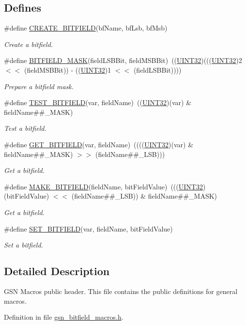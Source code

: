 \subsection*{Defines}
\begin{DoxyCompactItemize}
\item 
\#define \hyperlink{a00657_ga4af6407b36a81973e93a80026461312d}{CREATE\_\-BITFIELD}(bfName, bfLsb, bfMsb)
\begin{DoxyCompactList}\small\item\em Create a bitfield. \end{DoxyCompactList}\item 
\#define \hyperlink{a00657_ga330112fe57abc76abf484fedd191ca29}{BITFIELD\_\-MASK}(fieldLSBBit, fieldMSBBit)~((\hyperlink{a00660_gae1e6edbbc26d6fbc71a90190d0266018}{UINT32})(((\hyperlink{a00660_gae1e6edbbc26d6fbc71a90190d0266018}{UINT32})2 $<$$<$ (fieldMSBBit)) -\/ ((\hyperlink{a00660_gae1e6edbbc26d6fbc71a90190d0266018}{UINT32})1 $<$$<$ (fieldLSBBit))))
\begin{DoxyCompactList}\small\item\em Prepare a bitfield mask. \end{DoxyCompactList}\item 
\#define \hyperlink{a00657_ga99ab04466c2041af684f24ec71596969}{TEST\_\-BITFIELD}(var, fieldName)~((\hyperlink{a00660_gae1e6edbbc26d6fbc71a90190d0266018}{UINT32})(var) \& fieldName\#\#\_\-MASK)
\begin{DoxyCompactList}\small\item\em Test a bitfield. \end{DoxyCompactList}\item 
\#define \hyperlink{a00657_ga3e5cdd0d8d2d0a80286bfe31fe379530}{GET\_\-BITFIELD}(var, fieldName)~((((\hyperlink{a00660_gae1e6edbbc26d6fbc71a90190d0266018}{UINT32})(var) \& fieldName\#\#\_\-MASK) $>$$>$ (fieldName\#\#\_\-LSB)))
\begin{DoxyCompactList}\small\item\em Get a bitfield. \end{DoxyCompactList}\item 
\#define \hyperlink{a00657_ga32ad62c1b9d831dbd3c0cb56d39457fd}{MAKE\_\-BITFIELD}(fieldName, bitFieldValue)~(((\hyperlink{a00660_gae1e6edbbc26d6fbc71a90190d0266018}{UINT32})(bitFieldValue) $<$$<$ (fieldName\#\#\_\-LSB)) \& fieldName\#\#\_\-MASK)
\begin{DoxyCompactList}\small\item\em Get a bitfield. \end{DoxyCompactList}\item 
\#define \hyperlink{a00657_gab5ace147a6b9a49268acc7d8ae3f7524}{SET\_\-BITFIELD}(var, fieldName, bitFieldValue)
\begin{DoxyCompactList}\small\item\em Set a bitfield. \end{DoxyCompactList}\end{DoxyCompactItemize}


\subsection{Detailed Description}
GSN Macros public header. This file contains the public definitions for general macros. 

Definition in file \hyperlink{a00476_source}{gsn\_\-bitfield\_\-macros.h}.

